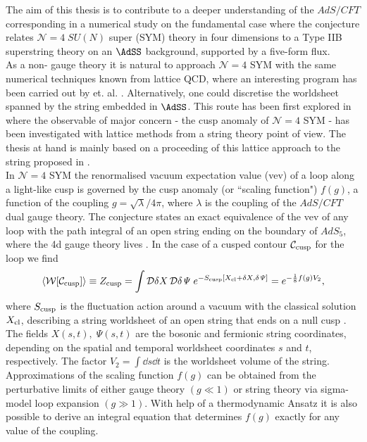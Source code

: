 The aim of this thesis is to contribute to a deeper understanding of the $AdS/CFT$ corresponding in a numerical study on the fundamental case where the conjecture relates $\mathcal{N}=4\; SU(N)$ super  (SYM) theory in four dimensions to a Type IIB superstring theory on an $\AdSS$ background, supported by a  five-form flux.\\
As a non- gauge theory it is natural to approach $\mathcal{N}=4$ SYM with the same numerical techniques known from lattice QCD, where an interesting program has been carried out by  et. al. \cite{Catterall_physrept, Bergner:2016sbv}. Alternatively, one could discretise the worldsheet spanned by the  string embedded in $\AdSS$. This route has been first explored in \cite{Roiban} where the observable of major concern - the cusp anomaly of $\mathcal{N}=4$ SYM - has been investigated with lattice methods from a string theory point of view. The thesis at hand is mainly based on a proceeding of this lattice approach to the  string  proposed in \cite{Bianchi:2016cyv,Forini:2016sot}. \\[0.5cm]
%
%
In $\mathcal{N}=4$ SYM the renormalised vacuum expectation value (vev) of a  loop along a light-like cusp is governed by the cusp anomaly (or ``scaling function") $f(g)$, a function of the coupling $g=\sqrt{\lambda}/4\pi$, where $\lambda$ is the  coupling of the $AdS/CFT$ dual gauge theory. The  conjecture states an exact equivalence of the vev of any  loop with the path integral of an open string ending on the boundary of $AdS_{5}$, where the 4d gauge theory lives \cite{maldacena2}. In the case of a cusped contour $\mathcal{C}_{\rm cusp}$ for the  loop we find
%
%
\begin{equation}
\langle \mathcal{W}[\mathcal{C}_{\rm cusp}] \rangle \equiv Z_{\rm cusp} = \int \mathcal{D}\delta X\,\mathcal{D}\delta\mathit{\Psi} \; e^{-S_{\rm cusp}[X_{\rm cl}+\delta X, \delta\mathit{\Psi} ]  } = e^{-\frac{1}{8}f(g) V_{2}},
\label{eq: intro_W_cusp}
\end{equation}
%
%
where $S_{\rm cusp}$ is the fluctuation action around a vacuum with the classical solution $X_{\rm cl}$, describing a string worldsheet of an open string that ends on a null cusp \cite{Giombi:2009gd}. The fields $X(s,t),\;\mathit{\Psi}(s,t)$ are the bosonic and fermionic string coordinates, depending on the spatial and temporal worldsheet coordinates $s$ and $t$, respectively. The factor $V_{2}=\int \dd s \dd t$ is the worldsheet volume of the string. Approximations of the scaling function $f(g)$ can be obtained from the perturbative limits of either gauge theory \cite{Bern:2006ew} $(g \ll 1)$ or string theory via sigma-model loop expansion \cite{Giombi:2009gd,Gubser:2002tv,Frolov:2002av} $(g \gg 1)$. With help of a thermodynamic  Ansatz it is also possible to derive an integral equation \cite{Beisert:2006ez} that determines $f(g)$ exactly for any value of the coupling.\\[0.5cm]
